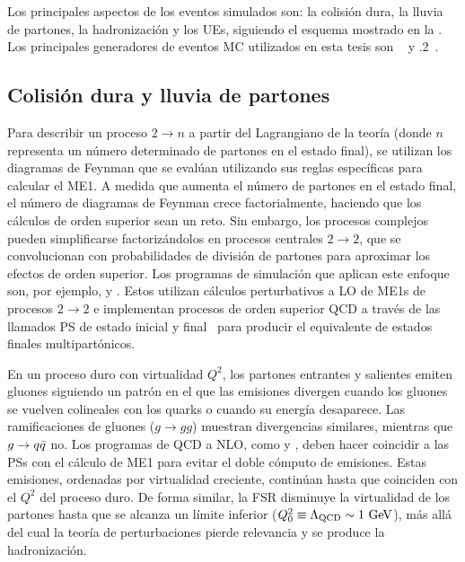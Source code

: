 Los principales aspectos de los eventos simulados son: la colisión dura, la lluvia de partones, la hadronización y los \acp{UE}, siguiendo el esquema mostrado en la \Fig{\ref{fig:theory:sm:hadron_interactions:parton_shower}}.
Los principales generadores de eventos \ac{MC} utilizados en esta tesis son ~\cite{Pythia8.1,Pythia8.2,Pythia8.3} y .2~\cite{Sherpa2.2}.

\subsection{Colisión dura y lluvia de partones}

Para describir un proceso \(2 \to n\) a partir del Lagrangiano de la teoría (donde \(n\) representa un número determinado de partones en el estado final), se utilizan los diagramas de Feynman que se evalúan utilizando sus reglas específicas para calcular el \ac{ME1}. A medida que aumenta el número de partones en el estado final, el número de diagramas de Feynman crece factorialmente, haciendo que los cálculos de orden superior sean un reto. Sin embargo, los procesos complejos pueden simplificarse factorizándolos en procesos centrales \(2 \to 2\), que se convolucionan con probabilidades de división de partones para aproximar los efectos de orden superior. Los programas de simulación que aplican este enfoque son, por ejemplo, \pythia y \Herwig. Estos utilizan cálculos perturbativos a \ac{LO} de \acp{ME1} de procesos \(2 \to 2\) e implementan procesos de orden superior \ac{QCD} a través de las llamados \ac{PS} de estado inicial y final~\cite{Sjostrand-2006,Dobbs-2004} para producir el equivalente de estados finales multipartónicos.

En un proceso duro con virtualidad \(Q^2\), los partones entrantes y salientes emiten gluones siguiendo un patrón en el que las emisiones divergen cuando los gluones se vuelven colineales con los quarks o cuando su energía desaparece. Las ramificaciones de gluones (\(g \to gg\)) muestran divergencias similares, mientras que \(g \rightarrow q\bar{q}\) no. Los programas de \ac{QCD} a \ac{NLO}, como \Sherpa y \POWHEG, deben hacer coincidir a las \acp{PS} con el cálculo de \ac{ME1} para evitar el doble cómputo de emisiones. Estas emisiones, ordenadas por virtualidad creciente, continúan hasta que coinciden con el \(Q^2\) del proceso duro. De forma similar, la \ac{FSR} disminuye la virtualidad de los partones hasta que se alcanza un límite inferior (\(Q^2_0 \equiv \Lambda_{\text{QCD}} \sim 1~\text{GeV}\)), más allá del cual la teoría de perturbaciones pierde relevancia y se produce la hadronización.

